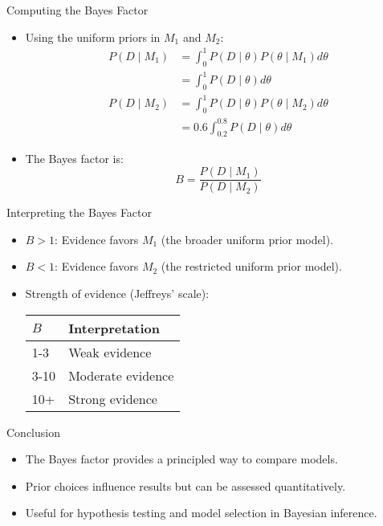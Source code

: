 \documentclass[aspectratio=169]{beamer}
\begin{document}
\begin{frame}{Computing the Bayes Factor}
    \begin{itemize}
        \item Using the uniform priors in \( M_1 \) and \( M_2 \):
        \begin{align*}
            P(D \mid M_1) &= \int_0^1 P(D \mid \theta) P(\theta \mid M_1) d\theta \\
                          &= \int_0^1 P(D \mid \theta) d\theta \\
            P(D \mid M_2) &= \int_{0}^{1} P(D \mid \theta) P(\theta \mid M_2) d\theta \\
                          &= 0.6\int_{0.2}^{0.8} P(D \mid \theta) d\theta
        \end{align*}
        \item The Bayes factor is:
        \[
            B = \frac{P(D \mid M_1)}{P(D \mid M_2)}
        \]
    \end{itemize}
\end{frame}

\begin{frame}{Interpreting the Bayes Factor}
    \begin{itemize}
        \item \( B > 1 \): Evidence favors \( M_1 \) (the broader uniform prior model).
        \item \( B < 1 \): Evidence favors \( M_2 \) (the restricted uniform prior model).
        \item Strength of evidence (Jeffreys' scale):
        \begin{table}
        \begin{tabular}{ll}
            \hline
            \( B \) & Interpretation \\
            \hline
            1-3 & Weak evidence \\
            3-10 & Moderate evidence \\
            10+ & Strong evidence \\
            \hline
        \end{tabular}
        \end{table}
    \end{itemize}
\end{frame}

\begin{frame}{Conclusion}
    \begin{itemize}
        \item The Bayes factor provides a principled way to compare models.
        \item Prior choices influence results but can be assessed quantitatively.
        \item Useful for hypothesis testing and model selection in Bayesian inference.
    \end{itemize}
\end{frame}


\maketitle
\end{document}
